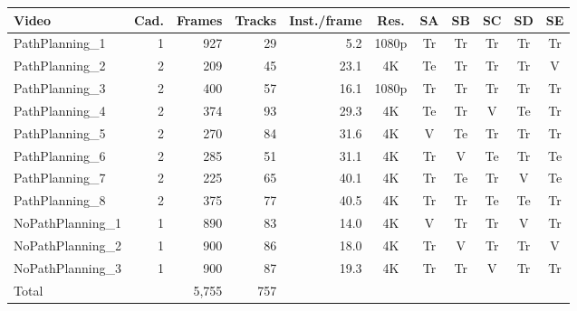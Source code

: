 \begin{tabular}{lrrrrcccccc}
\toprule
Video & Cad. & Frames & Tracks & Inst./frame & Res. & SA & SB & SC & SD & SE \\
\midrule
PathPlanning\_1 & 1 & 927 & 29 & 5.2 & 1080p & Tr & Tr & Tr & Tr & Tr \\
PathPlanning\_2 & 2 & 209 & 45 & 23.1 & 4K & Te & Tr & Tr & Tr & V \\
PathPlanning\_3 & 2 & 400 & 57 & 16.1 & 1080p & Tr & Tr & Tr & Tr & Tr \\
PathPlanning\_4 & 2 & 374 & 93 & 29.3 & 4K & Te & Tr & V & Te & Tr \\
PathPlanning\_5 & 2 & 270 & 84 & 31.6 & 4K & V & Te & Tr & Tr & Tr \\
PathPlanning\_6 & 2 & 285 & 51 & 31.1 & 4K & Tr & V & Te & Tr & Te \\
PathPlanning\_7 & 2 & 225 & 65 & 40.1 & 4K & Tr & Te & Tr & V & Te \\
PathPlanning\_8 & 2 & 375 & 77 & 40.5 & 4K & Tr & Tr & Te & Te & Tr \\
NoPathPlanning\_1 & 1 & 890 & 83 & 14.0 & 4K & V & Tr & Tr & V & Tr \\
NoPathPlanning\_2 & 1 & 900 & 86 & 18.0 & 4K & Tr & V & Tr & Tr & V \\
NoPathPlanning\_3 & 1 & 900 & 87 & 19.3 & 4K & Tr & Tr & V & Tr & Tr \\
\midrule
Total & & 5{,}755 & 757 & & & & & & & \\
\bottomrule
\end{tabular}
